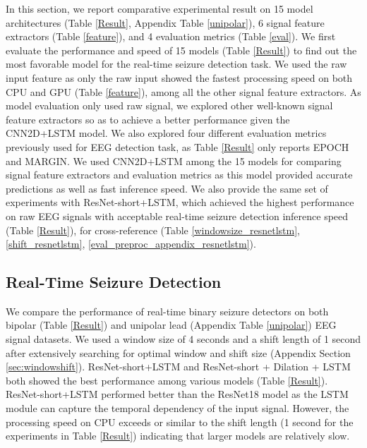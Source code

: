 \documentclass[pmlr,twocolumn,10pt]{jmlr}
\begin{document}
%
 
In this section, we report comparative experimental result on 15 model architectures (Table \ref{Result}, Appendix Table \ref{unipolar}), 6 signal feature extractors (Table \ref{feature}), and 4 evaluation metrics (Table \ref{eval}). We first evaluate the performance and speed of 15 models (Table \ref{Result}) to find out the most favorable model for the real-time seizure detection task. We used the raw input feature as only the raw input showed the fastest processing speed on both CPU and GPU (Table \ref{feature}), among all the other signal feature extractors. As model evaluation only used raw signal, we explored other well-known signal feature extractors so as to achieve a better performance given the CNN2D+LSTM model. We also explored four different evaluation metrics previously used for EEG detection task, as Table \ref{Result} only reports EPOCH and MARGIN. We used CNN2D+LSTM among the 15 models for comparing signal feature extractors and evaluation metrics as this model provided accurate predictions as well as fast inference speed. We also provide the same set of experiments with ResNet-short+LSTM, which achieved the highest performance on raw EEG signals with acceptable real-time seizure detection inference speed (Table \ref{Result}), for cross-reference (Table \ref{windowsize_resnetlstm}, \ref{shift_resnetlstm}, \ref{eval_preproc_appendix_resnetlstm}).



\subsection{Real-Time Seizure Detection}
\label{sec:results-realtime}
We compare the performance of real-time binary seizure detectors on both bipolar (Table \ref{Result}) and unipolar lead (Appendix Table \ref{unipolar}) EEG signal datasets. We used a window size of 4 seconds and a shift length of 1 second after extensively searching for optimal window and shift size (Appendix Section \ref{sec:windowshift}).
ResNet-short+LSTM and ResNet-short + Dilation + LSTM both showed the best performance among various models (Table \ref{Result}). 
ResNet-short+LSTM performed better than the ResNet18 model as the LSTM module can capture the temporal dependency of the input signal.
However, the processing speed on CPU exceeds or similar to the shift length (1 second for the experiments in Table \ref{Result}) indicating that larger models are relatively slow. 
\end{document}
